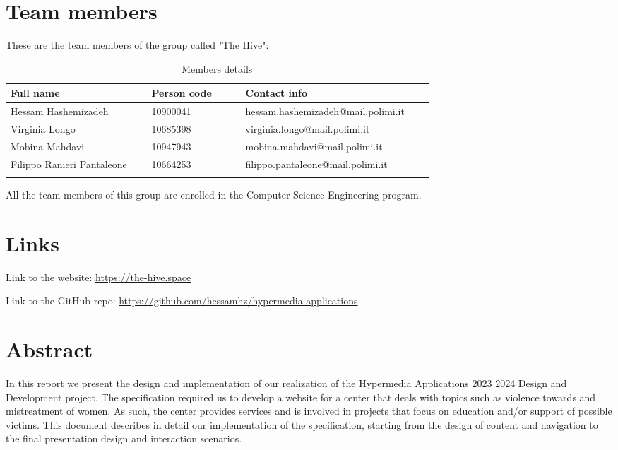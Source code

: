 \section{Team members}
These are the team members of the group called "The Hive":
\begin{longtable}
    {|m{0.3\linewidth}|m{0.2\linewidth}|m{0.4\linewidth}|}
            \hline
            \textbf{Full name} & \textbf{Person code} & \textbf{Contact info}\\
            \hline
            \endhead
                Hessam Hashemizadeh & 10900041 & hessam.hashemizadeh@mail.polimi.it \\
            \hline
                Virginia Longo & 10685398 & virginia.longo@mail.polimi.it \\
            \hline
                Mobina Mahdavi & 10947943 & mobina.mahdavi@mail.polimi.it \\
            \hline
                Filippo Ranieri Pantaleone & 10664253 & filippo.pantaleone@mail.polimi.it \\
            \hline
            \caption{Members details}
            \label{table:mem_details}
\end{longtable}


All the team members of this group are enrolled in the Computer Science Engineering program.

\section{Links}
Link to the website: \url{https://the-hive.space}

Link to the GitHub repo: \url{https://github.com/hessamhz/hypermedia-applications}

\section{Abstract}
In this report we present the design and implementation of our realization of the Hypermedia Applications 2023 2024 Design and Development project.
The specification required us to develop a website for a center that deals with topics such as violence towards and mistreatment of women. As such,
the center provides services and is involved in projects that focus on education and/or support of possible victims. This document describes in detail
our implementation of the specification, starting from the design of content and navigation to the final presentation design and interaction scenarios.
